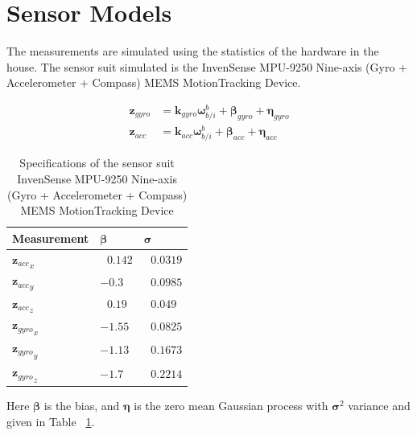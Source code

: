 \section{Sensor Models}

The measurements are simulated using the statistics of the hardware in the house.
The sensor suit simulated is the InvenSense MPU-9250 Nine-axis (Gyro + Accelerometer + Compass) MEMS MotionTracking Device. 
 
 \begin{align}
\bm{z}_{gyro} &= \bm{k}_{gyro} \bm{\omega}_{b/i}^b + \bm{\beta}_{gyro} + \bm{\eta}_{gyro}\\
\bm{z}_{acc} &= \bm{k}_{acc} \bm{\omega}_{b/i}^b + \bm{\beta}_{acc} + \bm{\eta}_{acc}
\end{align}

\begin{table}[!htbp]
\caption{Specifications of the sensor suit InvenSense MPU-9250 Nine-axis (Gyro + Accelerometer + Compass) MEMS MotionTracking Device\cite{condomines2015developpement}}
\label{arm:sensorSpecs}
\begin{center}
\begin{tabular}{ ||p{3cm}|p{2cm}|p{1.5cm}||}\hline
\textbf{Measurement} & $ \bm{\beta}$ &  $ \bm{\sigma}$ \\\hline
${\bm{z}_{acc}}_x$                  & $\ \ \, 0.142 $	   & $\ \ \, 0.0319$ \\\hline
${\bm{z}_{acc}}_y$       & $ -0.3 $           &  $\ \ \, 0.0985$ \\\hline
${\bm{z}_{acc}}_z$           & $\ \ \, 0.19$           & $\ \ \, 0.049$ \\\hline
${\bm{z}_{gyro}}_x$                  & $-1.55 $	   & $\ \ \, 0.0825$ \\\hline
${\bm{z}_{gyro}}_y$       & $ -1.13 $           &  $\ \ \, 0.1673$ \\\hline
${\bm{z}_{gyro}}_z$           & $-1.7$           & $\ \ \, 0.2214$ \\\hline
\end{tabular}
\end{center}
\end{table}

Here $\bm{\beta}$ is the bias, and $\bm{\eta}$ is the zero mean Gaussian process with $\bm{\sigma}^2$ variance and given in Table ~\ref{arm:sensorSpecs}.


